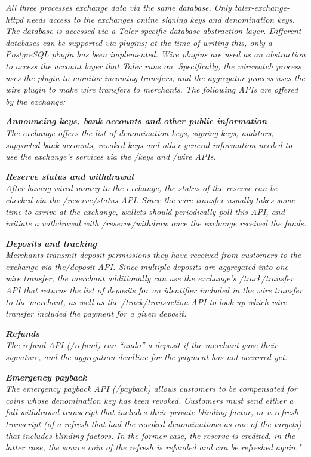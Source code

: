 \begin{center}
    \textit{
        All three processes exchange data via the same database. 
        Only taler-exchange-httpd needs access to the exchanges online signing keys and denomination keys.
        The database is accessed via a Taler-specific database abstraction layer. 
        Different databases  can  be  supported  via  plugins;  at  the  time  of  writing  this,  only  a PostgreSQL plugin has been implemented.
        Wire plugins are used as an abstraction to access the account layer that Taler runs on. 
        Specifically, the wirewatch process uses the plugin to monitor incoming transfers, and the aggregator process uses the wire plugin to make wire transfers to merchants.
        The following APIs are offered by the exchange:
    }

    \textbf{\textit{Announcing keys, bank accounts and other public information}}\\
    \textit{
            The exchange offers the list of denomination keys, signing keys, auditors, supported bank accounts, revoked keys and other general information needed to use the exchange’s services via the /keys and /wire APIs.
    }

    \textbf{\textit{Reserve status and withdrawal}}\\
    \textit{
            After having wired money to the exchange, the status of the reserve can be checked via the /reserve/status API. Since the wire transfer usually takes some time to arrive at the exchange, wallets should periodically poll this API, and initiate a withdrawal with /reserve/withdraw once the exchange received the funds.
    }

    \textbf{\textit{Deposits and tracking}}\\
    \textit{
            Merchants transmit deposit permissions they have received from customers to the exchange via the/deposit API. Since multiple deposits are aggregated into one wire transfer, the merchant additionally can use the exchange’s /track/transfer API that returns the list of deposits for an identifier included in the wire transfer to the merchant, as well as the /track/transaction API to look up which wire transfer included the payment for a given deposit.
    }

    \textbf{\textit{Refunds}}\\
    \textit{
            The refund API (/refund) can “undo” a deposit if the merchant gave their signature, and the aggregation deadline for the payment has not occurred yet.    
    }

    \textbf{\textit{Emergency payback}}\\
    \textit{
            The emergency payback API (/payback) allows customers to be compensated for coins whose denomination key has been revoked.
            Customers must send either a full withdrawal transcript that includes their private blinding factor, or a refresh transcript (of a refresh that had the revoked denominations as one of the targets) that includes blinding factors.
            In the former case, the reserve is credited, in the latter case, the source coin of the refresh is refunded and can be refreshed again."
    }
\end{center}

